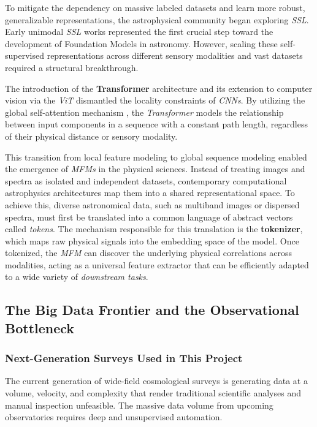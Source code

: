 To mitigate the dependency on massive labeled datasets and learn more robust, generalizable representations, the astrophysical community began exploring \textit{\gls{SSL}}. Early unimodal \textit{\gls{SSL}} works \autocites{ar:hayat-2021}{ar:sarmiento-2021} represented the first crucial step toward the development of Foundation Models in astronomy. However, scaling these self-supervised representations across different sensory modalities and vast datasets required a structural breakthrough.

The introduction of the \textbf{Transformer} architecture \autocite{ar:attention} and its extension to computer vision via the \textit{\gls{ViT}} \autocite{ar:dosovitskiy-2020} dismantled the locality constraints of \textit{\glspl{CNN}}. By utilizing the global self-attention mechanism \autocite{ar:attention}, the \textit{Transformer} models the relationship between input components in a sequence with a constant path length, regardless of their physical distance or sensory modality.

This transition from local feature modeling to global sequence modeling enabled the emergence of \textit{\glspl{MFM}} \autocite{ar:bommasani-2021} in the physical sciences. Instead of treating images and spectra as isolated and independent datasets, contemporary computational astrophysics architectures map them into a shared representational space. To achieve this, diverse astronomical data, such as multiband images or dispersed spectra, must first be translated into a common language of abstract vectors called \textit{tokens}. The mechanism responsible for this translation is the \textbf{tokenizer}, which maps raw physical signals into the embedding space of the model. Once tokenized, the \textit{\gls{MFM}} can discover the underlying physical correlations across modalities, acting as a universal feature extractor that can be efficiently adapted to a wide variety of \textit{downstream tasks}.


\subsection{The Big Data Frontier and the Observational Bottleneck}

\subsubsection{Next-Generation Surveys Used in This Project}

The current generation of wide-field cosmological surveys is generating data at a volume, velocity, and complexity that render traditional scientific analyses and manual inspection unfeasible. The massive data volume from upcoming observatories requires deep and unsupervised automation.

